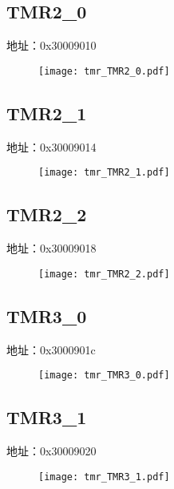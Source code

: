\subsection{TMR2\_0}
\label{tmr-TMR2-0}
地址：0x30009010
 \begin{figure}[H]
\texttt{[image: tmr\_TMR2\_0.pdf]}
\end{figure}

\subsection{TMR2\_1}
\label{tmr-TMR2-1}
地址：0x30009014
 \begin{figure}[H]
\texttt{[image: tmr\_TMR2\_1.pdf]}
\end{figure}

\subsection{TMR2\_2}
\label{tmr-TMR2-2}
地址：0x30009018
 \begin{figure}[H]
\texttt{[image: tmr\_TMR2\_2.pdf]}
\end{figure}

\subsection{TMR3\_0}
\label{tmr-TMR3-0}
地址：0x3000901c
 \begin{figure}[H]
\texttt{[image: tmr\_TMR3\_0.pdf]}
\end{figure}

\subsection{TMR3\_1}
\label{tmr-TMR3-1}
地址：0x30009020
 \begin{figure}[H]
\texttt{[image: tmr\_TMR3\_1.pdf]}
\end{figure}

